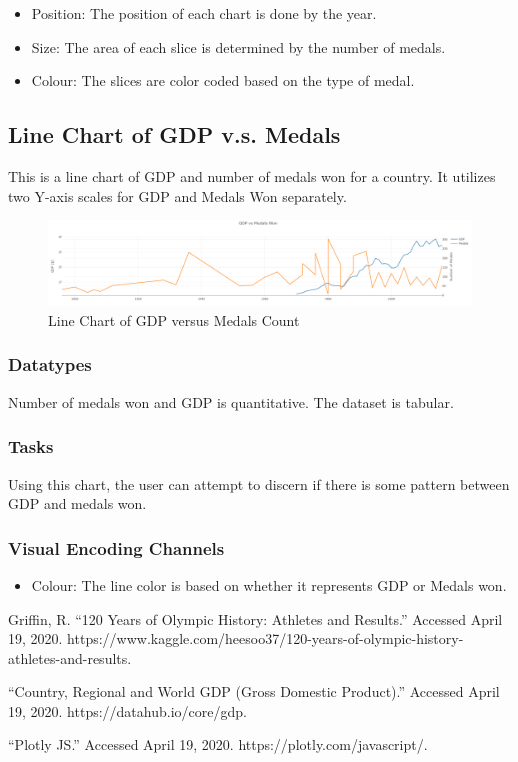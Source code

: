 \documentclass[a4paper, 10pt]{article}
\begin{document}
\begin{itemize}
	\item Position: The position of each chart is done by the year.
	\item Size: The area of each slice is determined by the number of medals.
	\item Colour: The slices are color coded based on the type of medal.
\end{itemize}

\subsection{Line Chart of GDP v.s. Medals}

This is a line chart of GDP and number of medals won for a country. It utilizes two Y-axis scales for GDP and Medals Won separately.

\begin{figure}[t]
\centering
\includegraphics[scale=0.3]{line.png}
\caption{Line Chart of GDP versus Medals Count}
\end{figure}


\subsubsection{Datatypes}
Number of medals won and GDP is quantitative. The dataset is tabular.

\subsubsection{Tasks}
Using this chart, the user can attempt to discern if there is some pattern between GDP and medals won. 

\subsubsection{Visual Encoding Channels}

\begin{itemize}
	\item Colour: The line color is based on whether it represents GDP or Medals won.
\end{itemize}


\begin{thebibliography}{9}

Griffin, R. ``120 Years of Olympic History: Athletes and Results.'' Accessed April 19, 2020. https://www.kaggle.com/heesoo37/120-years-of-olympic-history-athletes-and-results.

``Country, Regional and World GDP (Gross Domestic Product).'' Accessed April 19, 2020. https://datahub.io/core/gdp.

``Plotly JS.'' Accessed April 19, 2020. https://plotly.com/javascript/.
\end{thebibliography}
\label{LastPage}
\end{document}
